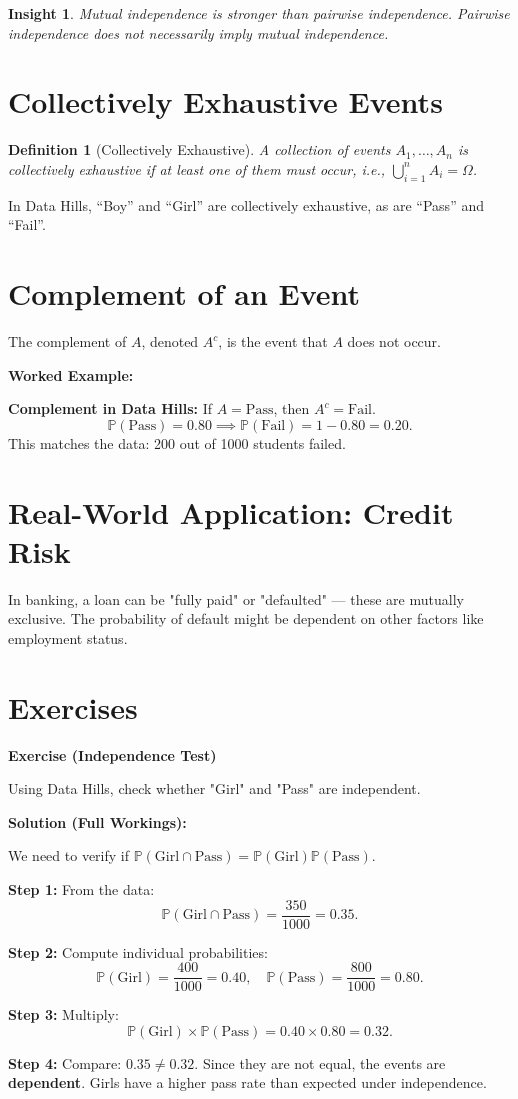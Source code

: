 \documentclass[12pt,a4paper,oneside]{report}
\theoremstyle{mytheorem}
\theoremstyle{mydefinition}
\newtheorem{definition}[theorem]{Definition}
\theoremstyle{myremark}
\newtheorem{insight}[theorem]{Insight}
\newenvironment{exercise}[1]{%
  \par\medskip\noindent\textbf{\color{myblue}Exercise (#1)}\par\smallskip
}{%
  \par\smallskip
}
\newenvironment{solution}{%
  \par\noindent\textbf{\color{mygreen}Solution (Full Workings):}\par\smallskip
}{%
  \par\bigskip
}
\newenvironment{worked}{%
  \par\medskip\noindent\textbf{\color{myorange}Worked Example:}\par\smallskip
}{%
  \par\medskip
}
\newcommand{\Prob}{\mathbb{P}}
\begin{document}
\begin{insight}
Mutual independence is stronger than pairwise independence. Pairwise independence does not necessarily imply mutual independence.
\end{insight}

\section{Collectively Exhaustive Events}
\begin{definition}[Collectively Exhaustive]
A collection of events $A_1, \ldots, A_n$ is collectively exhaustive if at least one of them must occur, i.e., $\bigcup_{i=1}^n A_i = \Omega$.
\end{definition}
In Data Hills, “Boy” and “Girl” are collectively exhaustive, as are “Pass” and “Fail”.

\section{Complement of an Event}
The complement of $A$, denoted $A^c$, is the event that $A$ does not occur.

\begin{worked}
\textbf{Complement in Data Hills:}
If $A = \text{Pass}$, then $A^c = \text{Fail}$.
\[
\Prob(\text{Pass}) = 0.80 \implies \Prob(\text{Fail}) = 1 - 0.80 = 0.20.
\]
This matches the data: 200 out of 1000 students failed.
\end{worked}

\section{Real-World Application: Credit Risk}
In banking, a loan can be "fully paid" or "defaulted" — these are mutually exclusive. The probability of default might be dependent on other factors like employment status.

\section{Exercises}
\begin{exercise}{Independence Test}
Using Data Hills, check whether "Girl" and "Pass" are independent.
\end{exercise}
\begin{solution}
We need to verify if $\Prob(\text{Girl} \cap \text{Pass}) = \Prob(\text{Girl})\Prob(\text{Pass})$.

\textbf{Step 1:} From the data:
\[
\Prob(\text{Girl} \cap \text{Pass}) = \frac{350}{1000} = 0.35.
\]

\textbf{Step 2:} Compute individual probabilities:
\[
\Prob(\text{Girl}) = \frac{400}{1000} = 0.40, \quad
\Prob(\text{Pass}) = \frac{800}{1000} = 0.80.
\]

\textbf{Step 3:} Multiply:
\[
\Prob(\text{Girl}) \times \Prob(\text{Pass}) = 0.40 \times 0.80 = 0.32.
\]

\textbf{Step 4:} Compare: $0.35 \neq 0.32$. Since they are not equal, the events are \textbf{dependent}. Girls have a higher pass rate than expected under independence.
\end{solution}
\end{document}
